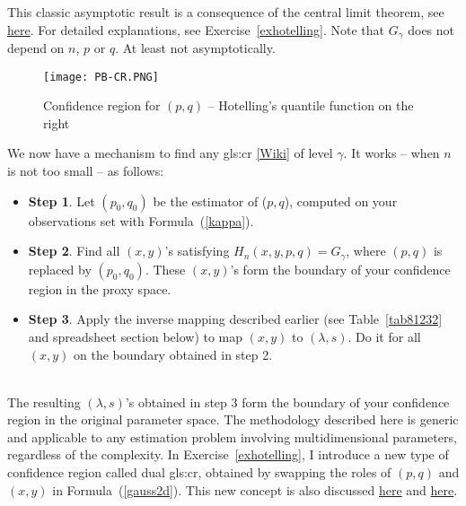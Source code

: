 \documentclass[10pt]{article}
\begin{document}
This classic asymptotic result is a consequence of the \textcolor{index}{central limit theorem}, see \href{https://stats.stackexchange.com/questions/372336/confidence-regions-on-bivariate-normal-distributions-using-hat-sigma-mle}{here}. For detailed explanations, see Exercise~\ref{exhotelling}. Note that $G_\gamma$ does not depend on $n$, $p$ or $q$. At least not asymptotically.

\begin{figure}[H]
\centering
\texttt{[image: PB-CR.PNG]}
\caption{Confidence region for $(p,q)$ -- Hotelling's quantile function on the right}
\label{fig:pbcr}
\end{figure}

We now have a mechanism to find any 
\gls{gls:cr} \href{https://en.wikipedia.org/wiki/Confidence_region}{[Wiki]} 
of 
\textcolor{index}{level} $\gamma$. It works -- when $n$ is not too small -- as follows: 
\quad \\
\begin{itemize}
\item {\bf Step 1}. Let $(p_0,q_0)$ be the estimator of ($p,q$), computed on your observations set with Formula~(\ref{kappa}).
\item {\bf Step 2}. Find all $(x,y)$'s satisfying $H_n(x,y,p,q)=G_\gamma$, where $(p,q)$ is replaced by $(p_0,q_0)$. These $(x,y)$'s form the boundary of your confidence 
region in the proxy space.
\item {\bf Step 3}. Apply the inverse mapping described earlier (see Table~\ref{tab81232} and spreadsheet section below) to map $(x,y)$ to $(\lambda,s)$. Do it for all $(x,y)$ on the boundary obtained in step 2. 

\end{itemize}
\quad \\
The resulting $(\lambda,s)$'s obtained in step 3 form the boundary of your confidence region in the original parameter space. The methodology described here is generic and applicable to any estimation problem involving multidimensional parameters, regardless of the complexity. In Exercise~\ref{exhotelling}, I introduce a new type of confidence region called 
\textcolor{index}{dual} \gls{gls:cr},
obtained by swapping the roles of $(p,q)$ and $(x,y)$ in Formula~(\ref{gauss2d}). This new concept is also discussed
 \href{https://stats.stackexchange.com/questions/564702/two-possible-definitions-of-confidence-regions-which-one-to-choose}{here} 
and \href{https://www.datasciencecentral.com/model-free-inference-for-machine-learning-professionals/}{here}.
\end{document}
